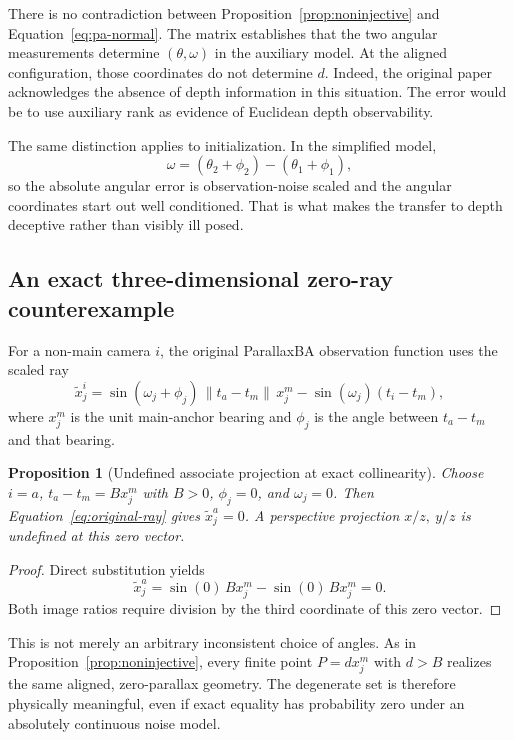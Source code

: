\documentclass[11pt,a4paper]{article}
\let\cite\citep
\newtheorem{proposition}[theorem]{Proposition}
\theoremstyle{definition}
\theoremstyle{remark}
\begin{document}
There is no contradiction between Proposition~\ref{prop:noninjective} and Equation~\eqref{eq:pa-normal}. The matrix establishes that the two angular measurements determine $(\theta,\omega)$ in the auxiliary model. At the aligned configuration, those coordinates do not determine $d$. Indeed, the original paper acknowledges the absence of depth information in this situation. The error would be to use auxiliary rank as evidence of Euclidean depth observability.

The same distinction applies to initialization. In the simplified model,
\begin{equation}
  \omega=(\theta_2+\phi_2)-(\theta_1+\phi_1),
\end{equation}
so the absolute angular error is observation-noise scaled and the angular coordinates start out well conditioned. That is what makes the transfer to depth deceptive rather than visibly ill posed.

\subsection{An exact three-dimensional zero-ray counterexample}
\label{sec:zero-ray}
For a non-main camera $i$, the original ParallaxBA observation function uses the scaled ray \cite[Eq.~(8)]{zhao2015parallaxba}
\begin{equation}
  \tilde x_j^i=
  \sin(\omega_j+\phi_j)\,\|t_a-t_m\|\,x_j^m
  -\sin(\omega_j)(t_i-t_m),
  \label{eq:original-ray}
\end{equation}
where $x_j^m$ is the unit main-anchor bearing and $\phi_j$ is the angle between $t_a-t_m$ and that bearing.

\begin{proposition}[Undefined associate projection at exact collinearity]
\label{prop:zero-ray}
Choose $i=a$, $t_a-t_m=B x_j^m$ with $B>0$, $\phi_j=0$, and $\omega_j=0$. Then Equation~\eqref{eq:original-ray} gives $\tilde x_j^a=0$. A perspective projection $x/z,\ y/z$ is undefined at this zero vector.
\end{proposition}
\begin{proof}
Direct substitution yields
\begin{equation}
  \tilde x_j^a=\sin(0)\,B x_j^m-\sin(0)\,B x_j^m=0.
\end{equation}
Both image ratios require division by the third coordinate of this zero vector.
\end{proof}

This is not merely an arbitrary inconsistent choice of angles. As in Proposition~\ref{prop:noninjective}, every finite point $P=d x_j^m$ with $d>B$ realizes the same aligned, zero-parallax geometry. The degenerate set is therefore physically meaningful, even if exact equality has probability zero under an absolutely continuous noise model.
\end{document}
